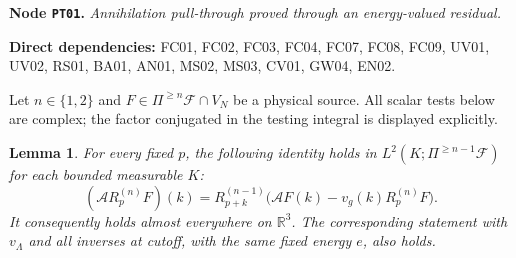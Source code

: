 \documentclass[11pt,a4paper]{article}
\newtheorem{lemma}[theorem]{Lemma}
\theoremstyle{remark}\newtheorem{remark}[theorem]{Remark}
\newcommand{\R}{\mathbb R}\newcommand{\C}{\mathbb C}\newcommand{\N}{\mathbb N}
\newcommand{\F}{\mathcal F}\newcommand{\Q}{\mathcal Q}\newcommand{\HH}{\mathcal H}
\newcommand{\node}[3]{\par\Needspace{6\baselineskip}\smallskip\hypertarget{node:#1}{}\label{nodepage:#1}\noindent\textbf{Node \texttt{#1}.} \textit{#2.}\par\noindent\textbf{Direct dependencies:} #3.\par}
\begin{document}
\node{PT01}{Annihilation pull-through proved through an energy-valued residual}{FC01, FC02, FC03, FC04, FC07, FC08, FC09, UV01, UV02, RS01, BA01, AN01, MS02, MS03, CV01, GW04, EN02}
Let $n\in\{1,2\}$ and $F\in\Pi^{\geq n}\F\cap V_N$ be a physical source. All scalar tests below are complex; the factor conjugated in the testing integral is displayed explicitly.
\begin{lemma}\label{lem:pullthrough}
For every fixed $p$, the following identity holds in $L^2(K;\Pi^{\geq n-1}\F)$ for each bounded measurable $K$:
\begin{equation}
 (\mathcal A R_p^{(n)}F)(k)
 =R_{p+k}^{(n-1)}\bigl(\mathcal AF(k)-v_g(k)R_p^{(n)}F\bigr).
 \label{eq:regularsourcePT}
\end{equation}
It consequently holds almost everywhere on $\R^3$. The corresponding statement with $v_\Lambda$ and all inverses at cutoff, with the same fixed energy $e$, also holds.
\end{lemma}
\end{document}
